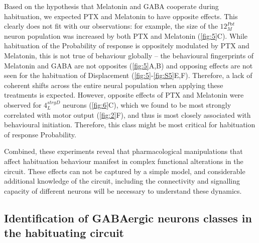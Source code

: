 \documentclass[9pt,lineno]{RandlettLab_elife}
\begin{document}
Based on the hypothesis that Melatonin and GABA cooperate during habituation, we expected PTX and Melatonin to have opposite effects. This clearly does not fit with our observations: for example, the size of the $12_{M}^{Pot}$ neuron population was increased by both PTX and Melatonin (\autoref{fig:5}C). While habituation of the Probability of response is oppositely modulated by PTX and Melatonin, this is not true of behaviour globally -- the behavioural fingerprints of Melatonin and GABA are not opposites (\autoref{fig:5}A,B) and opposing effects are not seen for the habituation of Displacement (\autoref{fig:5}-\autoref{fig:S5}E,F). Therefore, a lack of coherent shifts across the entire neural population when applying these treatments is expected. However, opposite effects of PTX and Melatonin were observed for $4_{L}^{strgD}$ neurons (\autoref{fig:6}C), which we found to be most strongly correlated with motor output (\autoref{fig:2}F), and thus is most closely associated with behavioural initiation. Therefore, this class might be most critical for habituation of response Probability. 

Combined, these experiments reveal that pharmacological manipulations that affect habituation behaviour manifest in complex functional alterations in the circuit. These effects can not be captured by a simple model, and considerable additional knowledge of the circuit, including the connectivity and signalling capacity of different neurons will be necessary to understand these dynamics. 

\subsection{Identification of GABAergic neurons classes in the habituating circuit}
\vspace{2mm}
\end{document}
